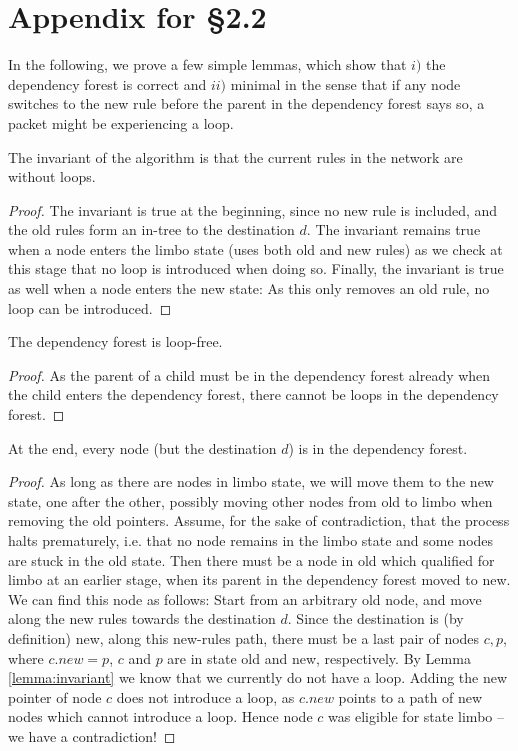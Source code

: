 \section{Appendix for \S2.2}

In the following, we prove a few simple lemmas, which show that $i)$ the dependency forest is correct and $ii)$ minimal in the sense that if any node switches to the new rule before the parent in the dependency forest says so, a packet might be experiencing a loop.

\begin{lemma}\label{lemma:invariant} The invariant of the algorithm is that the current rules in the network are without loops.
\end{lemma}

\begin{proof} The invariant is true at the beginning, since no new rule is included, and the old rules form an in-tree to the destination $d$. The invariant remains true when a node enters the limbo state (uses both old and new rules) as we check at this stage that no loop is introduced when doing so. Finally, the invariant is true as well when a node enters the new state: As this only removes an old rule, no loop can be introduced.
\end{proof}

\begin{lemma}\label{lemma:loop-free} The dependency forest is loop-free.
\end{lemma}

\begin{proof} As the parent of a child must be in the dependency forest already when the child enters the dependency forest, there cannot be loops in the dependency forest.
\end{proof}

\begin{lemma}\label{lemma:forest} At the end, every node (but the destination $d$) is in the dependency forest.
\end{lemma}

\begin{proof} As long as there are nodes in limbo state, we will move them to the new state, one after the other, possibly moving other nodes from old to limbo when removing the old pointers. Assume, for the sake of contradiction, that the process halts prematurely, i.e. that no node remains in the limbo state and some nodes are stuck in the old state. Then there must be a node in old which qualified for limbo at an earlier stage, when its parent in the dependency forest moved to new. We can find this node as follows: Start from an arbitrary old node, and move along the new rules towards the destination $d$. Since the destination is (by definition) new, along this new-rules path, there must be a last pair of nodes $c,p$, where $c.new = p$, $c$ and $p$ are in state old and new, respectively. By Lemma \ref{lemma:invariant} we know that we currently do not have a loop. Adding the new pointer of node $c$ does not introduce a loop, as $c.new$ points to a path of new nodes which cannot introduce a loop. Hence node $c$ was eligible for state limbo -- we have a contradiction!
\end{proof}

